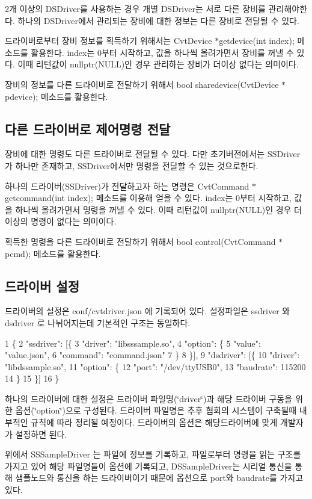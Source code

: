 2개 이상의 D\+S\+Driver를 사용하는 경우 개별 D\+S\+Driver는 서로 다른 장비를 관리해야한다. 하나의 D\+S\+Driver에서 관리되는 장비에 대한 정보는 다른 장비로 전달될 수 있다.

드라이버로부터 장비 정보를 획득하기 위해서는 Cvt\+Device $\ast$getdevice(int index); 메소드를 활용한다. index는 0부터 시작하고, 값을 하나씩 올려가면서 장비를 꺼낼 수 있다. 이때 리턴값이 nullptr(\+N\+U\+L\+L)인 경우 관리하는 장비가 더이상 없다는 의미이다.

장비의 정보를 다른 드라이버로 전달하기 위해서 bool sharedevice(\+Cvt\+Device $\ast$pdevice); 메소드를 활용한다.

\subsection*{다른 드라이버로 제어명령 전달}

장비에 대한 명령도 다른 드라이버로 전달될 수 있다. 다만 초기버전에서는 S\+S\+Driver가 하나만 존재하고, S\+S\+Driver에서만 명령을 전달할 수 있는 것으로한다.

하나의 드라이버(\+S\+S\+Driver)가 전달하고자 하는 명령은 Cvt\+Command $\ast$getcommand(int index); 메소드를 이용해 얻을 수 있다. index는 0부터 시작하고, 값을 하나씩 올려가면서 명령을 꺼낼 수 있다. 이때 리턴값이 nullptr(\+N\+U\+L\+L)인 경우 더이상의 명령이 없다는 의미이다.

획득한 명령을 다른 드라이버로 전달하기 위해서 bool control(\+Cvt\+Command $\ast$pcmd); 메소드를 활용한다.

\subsection*{드라이버 설정}

드라이버의 설정은 conf/cvtdriver.\+json 에 기록되어 있다. 설정파일은 ssdriver 와 dsdriver 로 나뉘어지는데 기본적인 구조는 동일하다.


\begin{DoxyCode}
1 \{
2     "ssdriver": [\{
3         "driver": "libsssample.so",
4         "option": \{
5             "value": "value.json",
6             "command": "command.json"
7         \}
8     \}],
9     "dsdriver": [\{
10         "driver": "libdssample.so",
11         "option": \{
12             "port": "/dev/ttyUSB0",
13             "baudrate": 115200
14         \}
15     \}]
16 \}
\end{DoxyCode}


하나의 드라이버에 대한 설정은 드라이버 파일명(\char`\"{}driver\char`\"{})과 해당 드라이버 구동을 위한 옵션(\char`\"{}option\char`\"{})으로 구성된다. 드라이버 파일명은 추후 협회의 시스템이 구축될때 내부적인 규칙에 따라 정리될 예정이다. 드라이버의 옵션은 해당드라이버에 맞게 개발자가 설정하면 된다.

위에서 S\+S\+Sample\+Driver 는 파일에 정보를 기록하고, 파일로부터 명령을 읽는 구조를 가지고 있어 해당 파일명들이 옵션에 기록되고, D\+S\+Sample\+Driver는 시리얼 통신을 통해 샘플노드와 통신을 하는 드라이버이기 때문에 옵션으로 port와 baudrate를 가지고 있다. 